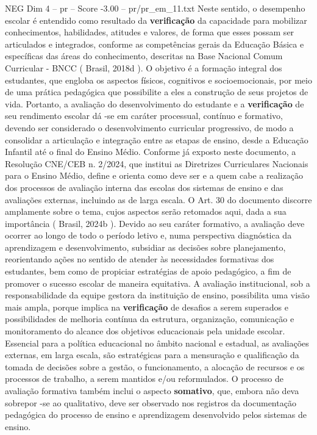 \begin{textsample}{NEG Dim 4 – pr – Score -3.00 – pr/pr\_em\_11.txt}
Neste sentido, o desempenho escolar é entendido como resultado da \textbf{verificação} da capacidade para mobilizar conhecimentos, habilidades, atitudes e valores, de forma que esses possam ser articulados e integrados, conforme as competências gerais da Educação Básica e específicas das áreas do conhecimento, descritas na Base Nacional Comum Curricular - BNCC ( Brasil, 2018d ).
O objetivo é a formação integral dos estudantes, que engloba os aspectos físicos, cognitivos e socioemocionais, por meio de uma prática pedagógica que possibilite a eles a construção de seus projetos de vida.
Portanto, a avaliação do desenvolvimento do estudante e a \textbf{verificação} de seu rendimento escolar dá -se em caráter processual, contínuo e formativo, devendo ser considerado o desenvolvimento curricular progressivo, de modo a consolidar a articulação e integração entre as etapas de ensino, desde a Educação Infantil até o final do Ensino Médio.
Conforme já exposto neste documento, a Resolução CNE/CEB n. 2/2024, que institui as Diretrizes Curriculares Nacionais para o Ensino Médio, define e orienta como deve ser e a quem cabe a realização dos processos de avaliação interna das escolas dos sistemas de ensino e das avaliações externas, incluindo as de larga escala.
O Art. 30 do documento discorre amplamente sobre o tema, cujos aspectos serão retomados aqui, dada a sua importância ( Brasil, 2024b ).
Devido ao seu caráter formativo, a avaliação deve ocorrer ao longo de todo o período letivo e, numa perspectiva diagnóstica da aprendizagem e desenvolvimento, subsidiar as decisões sobre planejamento, reorientando ações no sentido de atender às necessidades formativas dos estudantes, bem como de propiciar estratégias de apoio pedagógico, a fim de promover o sucesso escolar de maneira equitativa.
A avaliação institucional, sob a responsabilidade da equipe gestora da instituição de ensino, possibilita uma visão mais ampla, porque implica na \textbf{verificação} de desafios a serem superados e possibilidades de melhoria contínua da estrutura, organização, comunicação e monitoramento do alcance dos objetivos educacionais pela unidade escolar.
Essencial para a política educacional no âmbito nacional e estadual, as avaliações externas, em larga escala, são estratégicas para a mensuração e qualificação da tomada de decisões sobre a gestão, o funcionamento, a alocação de recursos e os processos de trabalho, a serem mantidos e/ou reformulados.
O processo de avaliação formativa também inclui o aspecto \textbf{somativo}, que, embora não deva sobrepor -se ao qualitativo, deve ser observado nos registros da documentação pedagógica do processo de ensino e aprendizagem desenvolvido pelos sistemas de ensino.

\end{textsample}
